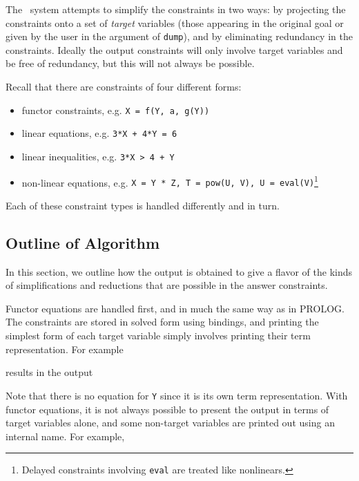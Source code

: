 The \CLPR\ system attempts to simplify 
the constraints in two ways: by projecting the constraints onto 
a set of {\em target\/} variables 
(those appearing in the original goal or given by the 
user in the argument of {\tt dump}), and by eliminating
redundancy in the constraints.  Ideally the output constraints will
only involve target variables and be free of redundancy, but
this will not always be possible.

Recall that there are constraints of four different forms:
\begin{itemize}
\item
functor constraints, e.g. {\tt X = f(Y, a, g(Y))}
\item
linear equations, e.g. {\tt 3*X + 4*Y = 6}
\item
linear inequalities, e.g. {\tt 3*X > 4 + Y}
\item
non-linear equations, 
e.g. {\tt X = Y * Z, T = pow(U, V), U = eval(V)}\footnote{
	Delayed constraints involving {\tt eval} are treated 
	like nonlinears.
}
\end{itemize}
Each of these constraint types is handled differently and in turn.

\subsection{Outline of Algorithm}

In this section, we outline how the output is obtained to give a flavor
of the kinds of simplifications and reductions that are possible
in the answer constraints.

Functor equations are handled first, and in much the same way as in
PROLOG. The constraints are stored in solved form using bindings, and
printing the simplest form of each target variable simply
involves printing their term representation. 
For example


\noindent
results in the output


\noindent
Note that there is no equation for {\tt Y} since it is its own 
term representation.   With functor equations, it is not always
possible to present the output in terms of target variables alone,
and some non-target variables are printed out using an internal name.
For example,


